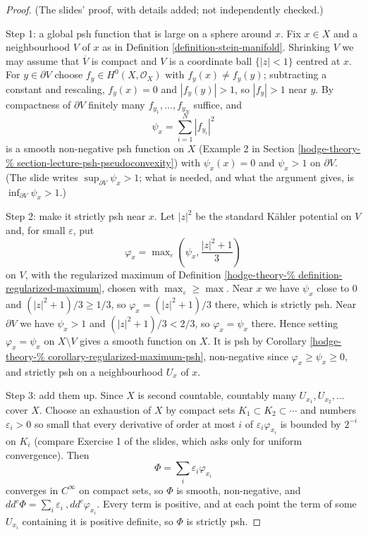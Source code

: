 \begin{proof}
(The slides' proof, with details added;
not independently checked.)

Step 1: a global psh function that is large
on a sphere around $x$. Fix $x\in X$ and a
neighbourhood $V$ of $x$ as in Definition
\ref{definition-stein-manifold}. Shrinking
$V$ we may assume that $\overline{V}$ is
compact and $V$ is a coordinate ball
$\{|z|<1\}$ centred at $x$. For $y\in\partial
V$ choose $f_y\in H^0(X,\mathcal{O}_X)$ with
$f_y(x)\neq f_y(y)$; subtracting a constant
and rescaling, $f_y(x)=0$ and $|f_y(y)|>1$,
so $|f_y|>1$ near $y$. By compactness of
$\partial V$ finitely many
$f_{y_1},\dots,f_{y_N}$ suffice, and
$$
\psi_x=\sum_{i=1}^N|f_{y_i}|^2
$$
is a smooth non-negative psh function on $X$
(Example 2 in Section
\ref{hodge-theory-%
section-lecture-psh-pseudoconvexity})
with $\psi_x(x)=0$ and $\psi_x>1$ on
$\partial V$. (The slide writes
$\sup_{\partial V}\psi_x>1$; what is needed,
and what the argument gives, is
$\inf_{\partial V}\psi_x>1$.)

Step 2: make it strictly psh near $x$. Let
$|z|^2$ be the standard K\"ahler potential on
$V$ and, for small $\varepsilon$, put
$$
\varphi_x=\max\nolimits_\varepsilon
\left(\psi_x,\frac{|z|^2+1}{3}\right)
$$
on $V$, with the regularized maximum of
Definition
\ref{hodge-theory-%
definition-regularized-maximum},
chosen with $\max_\varepsilon\geq\max$. Near
$x$ we have $\psi_x$ close to $0$ and
$(|z|^2+1)/3\geq1/3$, so
$\varphi_x=(|z|^2+1)/3$ there, which is
strictly psh. Near $\partial V$ we have
$\psi_x>1$ and $(|z|^2+1)/3<2/3$, so
$\varphi_x=\psi_x$ there. Hence setting
$\varphi_x=\psi_x$ on $X\setminus V$ gives a
smooth function on $X$. It is psh by
Corollary
\ref{hodge-theory-%
corollary-regularized-maximum-psh},
non-negative since
$\varphi_x\geq\psi_x\geq0$, and strictly psh
on a neighbourhood $U_x$ of $x$.

Step 3: add them up. Since $X$ is second
countable, countably many
$U_{x_1},U_{x_2},\dots$ cover $X$. Choose an
exhaustion of $X$ by compact sets $K_1\subset
K_2\subset\cdots$ and numbers
$\varepsilon_i>0$ so small that every
derivative of order at most $i$ of
$\varepsilon_i\varphi_{x_i}$ is bounded by
$2^{-i}$ on $K_i$ (compare Exercise 1 of the
slides, which asks only for uniform
convergence). Then
$$
\Phi=\sum_i\varepsilon_i\varphi_{x_i}
$$
converges in $C^\infty$ on compact sets, so
$\Phi$ is smooth, non-negative, and
$dd^c\Phi=\sum_i\varepsilon_i\
,dd^c\varphi_{x_i}$.
Every term is positive, and at each point the
term of some $U_{x_i}$ containing it is
positive definite, so $\Phi$ is strictly psh.
\end{proof}

